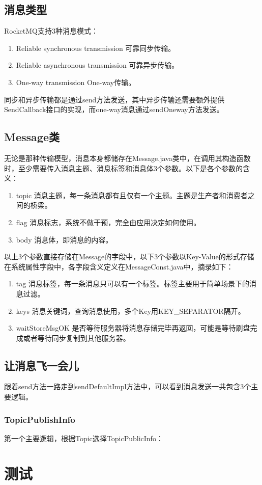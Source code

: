 \documentclass[UTF8]{ctexart}
\begin{document}
\subsection{消息类型}
RocketMQ支持3种消息模式：

\begin{enumerate}[itemindent=1em]
\item Reliable synchronous transmission 可靠同步传输。
\item Reliable asynchronous transmission 可靠异步传输。
\item One-way transmission One-way传输。
\end{enumerate} 

同步和异步传输都是通过send方法发送，其中异步传输还需要额外提供SendCallback接口的实现，而one-way消息通过sendOneway方法发送。

\subsection{Message类}
无论是那种传输模型，消息本身都储存在Message.java类中，在调用其构造函数时，至少需要传入消息主题、消息标签和消息体3个参数。以下是各个参数的含义：

\begin{enumerate}[itemindent=1em]
\item topic 消息主题，每一条消息都有且仅有一个主题。主题是生产者和消费者之间的桥梁。
\item flag 消息标志，系统不做干预，完全由应用决定如何使用。
\item body 消息体，即消息的内容。
\end{enumerate} 


以上3个参数直接存储在Message的字段中，以下3个参数以Key-Value的形式存储在系统属性字段中，各字段含义定义在MessageConst.java中，摘录如下：
\begin{enumerate}[itemindent=1em]
\item tag 消息标签，每一条消息只可以有一个标签。标签主要用于简单场景下的消息过滤\cite{filter-example}。
\item keys 消息关键词，查询消息使用，多个Key用KEY\_SEPARATOR隔开。
\item waitStoreMsgOK 是否等待服务器将消息存储完毕再返回，可能是等待刷盘完成或者等待同步复制到其他服务器。
\end{enumerate} 


\subsection{让消息飞一会儿}
跟着send方法一路走到sendDefaultImpl方法中，可以看到消息发送一共包含3个主要逻辑。

\subsubsection{TopicPublishInfo}
第一个主要逻辑，根据Topic选择TopicPublicInfo：

\section{测试}

\newpage

 
\end{document}
